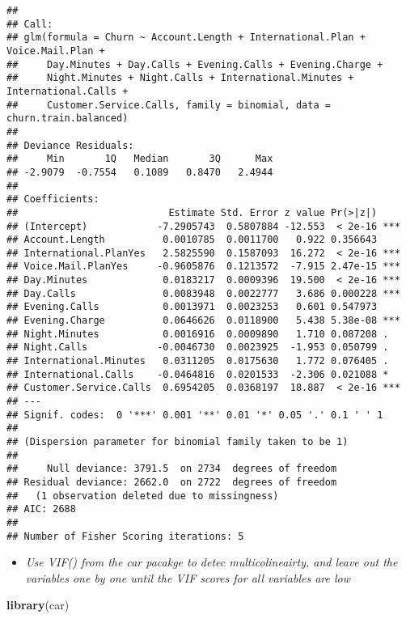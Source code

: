 \documentclass[]{article}
\newenvironment{Shaded}{\begin{snugshade}}{\end{snugshade}}
\newcommand{\KeywordTok}[1]{\textcolor[rgb]{0.13,0.29,0.53}{\textbf{#1}}}
\newcommand{\NormalTok}[1]{#1}
\providecommand{\tightlist}{%
  \setlength{\itemsep}{0pt}\setlength{\parskip}{0pt}}
\begin{document}
\begin{verbatim}
## 
## Call:
## glm(formula = Churn ~ Account.Length + International.Plan + Voice.Mail.Plan + 
##     Day.Minutes + Day.Calls + Evening.Calls + Evening.Charge + 
##     Night.Minutes + Night.Calls + International.Minutes + International.Calls + 
##     Customer.Service.Calls, family = binomial, data = churn.train.balanced)
## 
## Deviance Residuals: 
##     Min       1Q   Median       3Q      Max  
## -2.9079  -0.7554   0.1089   0.8470   2.4944  
## 
## Coefficients:
##                          Estimate Std. Error z value Pr(>|z|)    
## (Intercept)            -7.2905743  0.5807884 -12.553  < 2e-16 ***
## Account.Length          0.0010785  0.0011700   0.922 0.356643    
## International.PlanYes   2.5825590  0.1587093  16.272  < 2e-16 ***
## Voice.Mail.PlanYes     -0.9605876  0.1213572  -7.915 2.47e-15 ***
## Day.Minutes             0.0183217  0.0009396  19.500  < 2e-16 ***
## Day.Calls               0.0083948  0.0022777   3.686 0.000228 ***
## Evening.Calls           0.0013971  0.0023253   0.601 0.547973    
## Evening.Charge          0.0646626  0.0118900   5.438 5.38e-08 ***
## Night.Minutes           0.0016916  0.0009890   1.710 0.087208 .  
## Night.Calls            -0.0046730  0.0023925  -1.953 0.050799 .  
## International.Minutes   0.0311205  0.0175630   1.772 0.076405 .  
## International.Calls    -0.0464816  0.0201533  -2.306 0.021088 *  
## Customer.Service.Calls  0.6954205  0.0368197  18.887  < 2e-16 ***
## ---
## Signif. codes:  0 '***' 0.001 '**' 0.01 '*' 0.05 '.' 0.1 ' ' 1
## 
## (Dispersion parameter for binomial family taken to be 1)
## 
##     Null deviance: 3791.5  on 2734  degrees of freedom
## Residual deviance: 2662.0  on 2722  degrees of freedom
##   (1 observation deleted due to missingness)
## AIC: 2688
## 
## Number of Fisher Scoring iterations: 5
\end{verbatim}

\begin{itemize}
\tightlist
\item
  \emph{Use VIF() from the car pacakge to detec multicolineairty, and
  leave out the variables one by one until the VIF scores for all
  variables are low}
\end{itemize}

\begin{Shaded}
\begin{Highlighting}[]
\KeywordTok{library}\NormalTok{(car)}
\end{Highlighting}
\end{Shaded}
\end{document}
